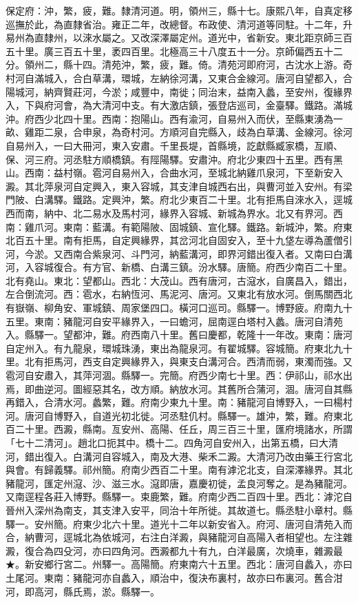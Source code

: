 \begin{pinyinscope}
保定府：沖，繁，疲，難。隸清河道。明，領州三，縣十七。康熙八年，自真定移巡撫於此，為直隸省治。雍正二年，改總督。布政使、清河道等同駐。十二年，升易州為直隸州，以淶水屬之。又改深澤屬定州。道光中，省新安。東北距京師三百五十里。廣三百五十里，袤四百里。北極高三十八度五十一分。京師偏西五十二分。領州二，縣十四。清苑沖，繁，疲，難。倚。清苑河即府河，古沈水上游。奇村河自滿城入，合白草溝，環城，左納徐河溝，又東合金線河。唐河自望都入，合陽城河，納齊賢莊河，今淤；咸豐中，南徙；同治末，益南入蠡，至安州，復緣界入，下與府河會，為大清河中支。有大激店鎮，張登店巡司，金臺驛。鐵路。滿城沖。府西少北四十里。西南：抱陽山。西有渝河，自易州入而伏，至縣東湧為一畝、雞距二泉，合申泉，為奇村河。方順河自完縣入，歧為白草溝、金線河。徐河自易州入，一曰大冊河，東入安肅。千里長堤，首縣境，訖獻縣臧家橋，亙順、保、河三府。河丞駐方順橋鎮。有陘陽驛。安肅沖。府北少東四十五里。西有黑山。西南：益村嶺。雹河自易州入，合曲水河，至城北納雞爪泉河，下至新安入澱。其北萍泉河自定興入，東入容城，其支津自城西右出，與曹河並入安州。有梁門陂、白溝驛。鐵路。定興沖，繁。府北少東百二十里。北有拒馬自淶水入，逕城西而南，納中、北二易水及馬村河，緣界入容城、新城為界水。北又有界河。西南：雞爪河。東南：藍溝。有範陽陂、固城鎮、宣化驛。鐵路。新城沖，繁。府東北百五十里。南有拒馬，自定興緣界，其岔河北自固安入，至十九垡左導為蘆僧引河，今淤。又西南合紫泉河、斗門河，納藍溝河，即界河錯出復入者。又南曰白溝河，入容城復合。有方官、新橋、白溝三鎮。汾水驛。唐簡。府西少南百二十里。北有堯山。東北：望都山。西北：大茂山。西有唐河，古滱水，自廣昌入，錯出，左合倒流河。西：雹水，右納恆河、馬泥河、唐河。又東北有放水河。倒馬關西北有嶽嶺、柳角安、軍城鎮、周家堡四口。橫河口巡司。縣驛一。博野疲。府南九十五里。東南：豬龍河自安平緣界入，一曰蟾河，屈南逕白塔村入蠡。唐河自清苑入。縣驛一。望都沖，難。府西南八十里。舊曰慶都，乾隆十一年改。東南：唐河自定州入。有九龍泉，環城珠湧，東出為龍泉河。有翟城驛。容城簡。府東北九十里。北有拒馬河，西支自定興緣界入，與東支白溝河合。西清而弱，東濁而強。又雹河自安肅入，其萍河涸。縣驛一。完簡。府西少南七十里。西：伊祁山，祁水出焉，即曲逆河。圖經惡其名，改方順。納放水河。其舊所合蒲河，涸。唐河自其縣再錯入，合清水河。蠡繁，難。府南少東九十里。南：豬龍河自博野入，一曰楊村河。唐河自博野入，自道光初北徙。河丞駐仉村。縣驛一。雄沖，繁，難。府東北百二十里。西澱，縣南。亙安州、高陽、任丘，周三百三十里，匯府境諸水，所謂「七十二清河」。趙北口扼其中。橋十二。四角河自安州入，出第五橋，曰大清河，錯出復入。白溝河自容城入，南及大港、柴禾二澱。大清河乃改由藥王行宮北與會。有歸義驛。祁州簡。府南少西百二十里。南有滹沱北支，自深澤緣界。其北豬龍河，匯定州滱、沙、滋三水。滱即唐，嘉慶初徙，孟良河奪之。是為豬龍河。又南逕程各莊入博野。縣驛一。束鹿繁，難。府南少西二百四十里。西北：滹沱自晉州入深州為南支，其支津入安平，同治十年所徙。其故道七。縣丞駐小章村。縣驛一。安州簡。府東少北六十里。道光十二年以新安省入。府河、唐河自清苑入而合，納曹河，逕城北為依城河，右注白洋澱，與豬龍河自高陽入者相望也。左注雜澱，復合為四殳河，亦曰四角河。西澱都九十有九，白洋最廣，次燒車，雜澱最★。新安鄉行宮二。州驛一。高陽簡。府東南六十五里。西北：唐河自蠡入，亦曰土尾河。東南：豬龍河亦自蠡入，順治中，復決布裏村，故亦曰布裏河。舊合泔河，即高河，縣氏焉，淤。縣驛一。


\end{pinyinscope}
